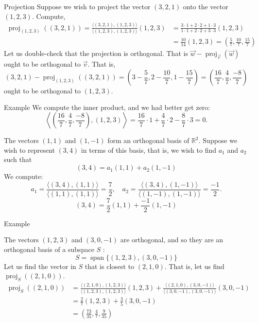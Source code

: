\documentclass[11pt]{beamer}
\theoremstyle{plain}
\begin{document}
\begin{frame}{Projection}
    Suppose we wish to project the vector $(3,2,1)$ onto the vector $(1,2,3)$. Compute,
$$
\begin{aligned}
\operatorname{proj}_{(1,2,3)}((3,2,1))=\frac{\langle(3,2,1),(1,2,3)\rangle}{\langle(1,2,3),(1,2,3)\rangle}(1,2,3) & =\frac{3 \cdot 1+2 \cdot 2+1 \cdot 3}{1 \cdot 1+2 \cdot 2+3 \cdot 3}(1,2,3) \\
& =\frac{10}{14}(1,2,3)=\left(\frac{5}{7}, \frac{10}{7}, \frac{15}{7}\right)
\end{aligned}
$$
Let us double-check that the projection is orthogonal. That is $\vec{w}-\operatorname{proj}_{\vec{v}}(\vec{w})$ ought to be orthogonal to $\vec{v}$. That is,
$$
(3,2,1)-\operatorname{proj}_{(1,2,3)}((3,2,1))=\left(3-\frac{5}{7}, 2-\frac{10}{7}, 1-\frac{15}{7}\right)=\left(\frac{16}{7}, \frac{4}{7}, \frac{-8}{7}\right)
$$
ought to be orthogonal to $(1,2,3)$. 
\end{frame}

\begin{frame}{Example}
We compute the inner product, and we had better get zero:
$$
\left\langle\left(\frac{16}{7}, \frac{4}{7}, \frac{-8}{7}\right),(1,2,3)\right\rangle=\frac{16}{7} \cdot 1+\frac{4}{7} \cdot 2-\frac{8}{7} \cdot 3=0 .
$$
\begin{example}
    The vectors $(1,1)$ and $(1,-1)$ form an orthogonal basis of $\mathbb{R}^2$. Suppose we wish to represent $(3,4)$ in terms of this basis, that is, we wish to find $a_1$ and $a_2$ such that
$$
(3,4)=a_1(1,1)+a_2(1,-1)
$$
We compute:
$$
a_1=\frac{\langle(3,4),(1,1)\rangle}{\langle(1,1),(1,1)\rangle}=\frac{7}{2}, \quad a_2=\frac{\langle(3,4),(1,-1)\rangle}{\langle(1,-1),(1,-1)\rangle}=\frac{-1}{2} .
$$
$$
(3,4)=\frac{7}{2}(1,1)+\frac{-1}{2}(1,-1)
$$
\end{example}
\end{frame}

\begin{frame}{Example}
    \begin{example}
        The vectors $(1,2,3)$ and $(3,0,-1)$ are orthogonal, and so they are an orthogonal basis of a subspace $S$ :
$$
S=\operatorname{span}\{(1,2,3),(3,0,-1)\}
$$
Let us find the vector in $S$ that is closest to $(2,1,0)$. That is, let us find $\operatorname{proj}_S((2,1,0))$.
$$
\begin{aligned}
\operatorname{proj}_S((2,1,0)) & =\frac{\langle(2,1,0),(1,2,3)\rangle}{\langle(1,2,3),(1,2,3)\rangle}(1,2,3)+\frac{\langle(2,1,0),(3,0,-1)\rangle}{\langle(3,0,-1),(3,0,-1)\rangle}(3,0,-1) \\
& =\frac{2}{7}(1,2,3)+\frac{3}{5}(3,0,-1) \\
& =\left(\frac{73}{35}, \frac{4}{7}, \frac{9}{35}\right)
\end{aligned}
$$
    \end{example}
\end{frame}
\end{document}
